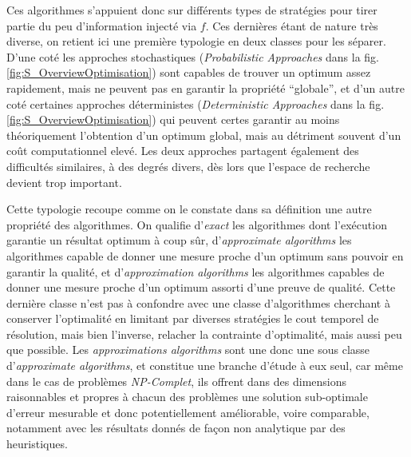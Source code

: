Ces algorithmes s'appuient donc sur différents types de stratégies pour tirer partie du peu d'information injecté via $f$. Ces dernières étant de nature très diverse, on retient ici une première typologie en deux classes pour les séparer. D'une coté les approches stochastiques (\textit{Probabilistic Approaches} dans la fig. \ref{fig:S_OverviewOptimisation}) sont capables de trouver un optimum assez rapidement, mais ne peuvent pas en garantir la propriété \enquote{globale}, et d'un autre coté certaines approches déterministes (\textit{Deterministic Approaches} dans la fig. \ref{fig:S_OverviewOptimisation}) qui peuvent certes garantir au moins théoriquement l'obtention d'un optimum global, mais au détriment souvent d'un coût computationnel elevé. Les deux approches partagent également des difficultés similaires, à des degrés divers, dès lors que l'espace de recherche devient trop important.

Cette typologie recoupe comme on le constate dans sa définition une autre propriété des algorithmes. On qualifie d'\textit{exact} les algorithmes dont l'exécution garantie un résultat optimum à coup sûr, d'\textit{approximate algorithms} les algorithmes capable de donner une mesure proche d'un optimum sans pouvoir en garantir la qualité, et d'\textit{approximation algorithms} les algorithmes capables de donner une mesure proche d'un optimum assorti d'une preuve de qualité. Cette dernière classe n'est pas à confondre avec une classe d'algorithmes cherchant à conserver l'optimalité en limitant par diverses stratégies le cout temporel de résolution, mais bien l'inverse, relacher la contrainte d'optimalité, mais aussi peu que possible. Les \textit{approximations algorithms} sont une donc une sous classe d'\textit{approximate algorithms}, et constitue une branche d'étude à eux seul, car même dans le cas de problèmes \textit{NP-Complet}, ils offrent dans des dimensions raisonnables et propres à chacun des problèmes une solution sub-optimale d'erreur mesurable et donc potentiellement améliorable, voire comparable, notamment avec les résultats donnés de façon non analytique par des heuristiques. 

